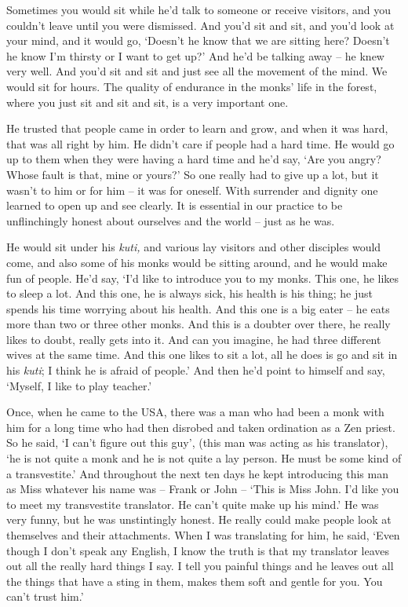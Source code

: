 Sometimes you would sit while he'd talk to someone or receive visitors,
and you couldn't leave until you were dismissed. And you'd sit and sit,
and you'd look at your mind, and it would go, `Doesn't he know that we
are sitting here? Doesn't he know I'm thirsty or I want to get up?' And
he'd be talking away -- he knew very well. And you'd sit and sit and
just see all the movement of the mind. We would sit for hours. The
quality of endurance in the monks' life in the forest, where you just
sit and sit and sit, is a very important one.

He trusted that people came in order to learn and grow, and when it was
hard, that was all right by him. He didn't care if people had a hard
time. He would go up to them when they were having a hard time and he'd
say, `Are you angry? Whose fault is that, mine or yours?' So one really
had to give up a lot, but it wasn't to him or for him -- it was for
oneself. With surrender and dignity one learned to open up and see
clearly. It is essential in our practice to be unflinchingly honest
about ourselves and the world -- just as he was.

He would sit under his \emph{kuti,} and various lay visitors and other
disciples would come, and also some of his monks would be sitting
around, and he would make fun of people. He'd say, `I'd like to
introduce you to my monks. This one, he likes to sleep a lot. And this
one, he is always sick, his health is his thing; he just spends his time
worrying about his health. And this one is a big eater -- he eats more
than two or three other monks. And this is a doubter over there, he
really likes to doubt, really gets into it. And can you imagine, he had
three different wives at the same time. And this one likes to sit a lot,
all he does is go and sit in his \emph{kuti}; I think he is afraid of
people.' And then he'd point to himself and say, `Myself, I like to play
teacher.'

Once, when he came to the USA, there was a man who had been a monk with
him for a long time who had then disrobed and taken ordination as a Zen
priest. So he said, `I can't figure out this guy', (this man was acting
as his translator), `he is not quite a monk and he is not quite a lay
person. He must be some kind of a transvestite.' And throughout the next
ten days he kept introducing this man as Miss whatever his name was --
Frank or John -- `This is Miss John. I'd like you to meet my
transvestite translator. He can't quite make up his mind.' He was very
funny, but he was unstintingly honest. He really could make people look
at themselves and their attachments. When I was translating for him, he
said, `Even though I don't speak any English, I know the truth is that
my translator leaves out all the really hard things I say. I tell you
painful things and he leaves out all the things that have a sting in
them, makes them soft and gentle for you. You can't trust him.'

